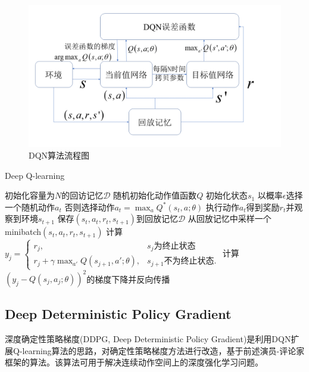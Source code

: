 \begin{figure}[htb]
  \centering
  \includegraphics[width=\textwidth]{figures/DQN.png}
  \caption{DQN算法流程图}\label{dqn}
\end{figure}

\begin{algorithm}[htb]
\caption{Deep Q-learning}
\label{dqnalgorithm}
\begin{algorithmic}[1]
\State 初始化容量为$N$的回访记忆$\mathcal{D}$
\State 随机初始化动作值函数$Q$
    \State 初始化状态$s_1$
        \State 以概率$\epsilon$选择一个随机动作$a_t$
        \State 否则选择动作$a_t = \max_a Q^*(s_t,a;\theta)$
        \State 执行动作$a_t$得到奖励$r_t$并观察到环境$s_{t+1}$
        \State 保存$(s_t, a_t, r_t, s_{t+1})$到回放记忆$\mathcal{D}$
        \State 从回放记忆中采样一个minibatch$(s_t, a_t, r_t, s_{t+1})$
        \State 计算$y_j = \begin{cases} r_j,  & \text{$s_j$为终止状态} \\ r_j + \gamma \max_{a'} Q(s_{j+1}, a'; \theta), & \text{$s_{j+1}$不为终止状态}. \end{cases}$
        \State 计算$(y_j - Q(s_j, a_j; \theta))^2$的梯度下降并反向传播
    \EndFor
\EndFor
\end{algorithmic}
\end{algorithm}

\subsection{Deep Deterministic Policy Gradient}
深度确定性策略梯度(DDPG, Deep Deterministic Policy Gradient)是利用DQN扩展Q-learning算法的思路，对确定性策略梯度方法进行改造，基于前述演员-评论家框架的算法。该算法可用于解决连续动作空间上的深度强化学习问题。

